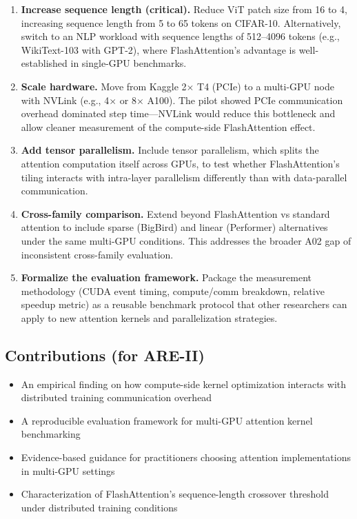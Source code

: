 \documentclass[12pt, a4paper]{article}
\begin{document}
\begin{enumerate}
    \item \textbf{Increase sequence length (critical).} Reduce ViT patch size from 16 to 4, increasing sequence length from 5 to 65 tokens on CIFAR-10. Alternatively, switch to an NLP workload with sequence lengths of 512--4096 tokens (e.g., WikiText-103 with GPT-2), where FlashAttention's advantage is well-established in single-GPU benchmarks.

    \item \textbf{Scale hardware.} Move from Kaggle 2$\times$ T4 (PCIe) to a multi-GPU node with NVLink (e.g., 4$\times$ or 8$\times$ A100). The pilot showed PCIe communication overhead dominated step time---NVLink would reduce this bottleneck and allow cleaner measurement of the compute-side FlashAttention effect.

    \item \textbf{Add tensor parallelism.} Include tensor parallelism, which splits the attention computation itself across GPUs, to test whether FlashAttention's tiling interacts with intra-layer parallelism differently than with data-parallel communication.

    \item \textbf{Cross-family comparison.} Extend beyond FlashAttention vs standard attention to include sparse (BigBird) and linear (Performer) alternatives under the same multi-GPU conditions. This addresses the broader A02 gap of inconsistent cross-family evaluation.

    \item \textbf{Formalize the evaluation framework.} Package the measurement methodology (CUDA event timing, compute/comm breakdown, relative speedup metric) as a reusable benchmark protocol that other researchers can apply to new attention kernels and parallelization strategies.
\end{enumerate}

\subsection{Contributions (for ARE-II)}
\begin{itemize}
    \item An empirical finding on how compute-side kernel optimization interacts with distributed training communication overhead
    \item A reproducible evaluation framework for multi-GPU attention kernel benchmarking
    \item Evidence-based guidance for practitioners choosing attention implementations in multi-GPU settings
    \item Characterization of FlashAttention's sequence-length crossover threshold under distributed training conditions
\end{itemize}
\end{document}

